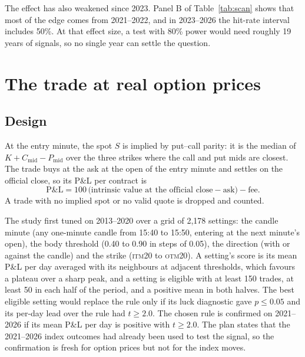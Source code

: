 \documentclass[12pt,letterpaper]{article}
\newcommand{\ITM}[1]{\textsc{itm}#1}
\newcommand{\OTM}[1]{\textsc{otm}#1}
\begin{document}
The effect has also weakened since 2023. Panel B of Table~\ref{tab:scan} shows
that most of the edge comes from 2021--2022, and in 2023--2026 the hit-rate
interval includes 50\%. At that effect size, a test with 80\% power would need
roughly 19 years of signals, so no single year can settle the question.

\section{The trade at real option prices}
\label{sec:realprice}



\subsection{Design}

At the entry minute, the spot $S$ is implied by put--call parity: it is the
median of $K + C_{\text{mid}} - P_{\text{mid}}$ over the three strikes where the
call and put mids are closest. The trade buys at the ask at the open of the entry
minute and settles on the official close, so its P\&L per contract is
\begin{equation}
\text{P\&L} = 100\,\bigl(\text{intrinsic value at the official close} - \text{ask}\bigr) - \text{fee}.
\end{equation}
A trade with no implied spot or no valid quote is dropped and counted.

The study first tuned on 2013--2020 over a grid of 2{,}178 settings: the candle
minute (any one-minute candle from 15:40 to 15:50, entering at the next minute's
open), the body threshold (0.40 to 0.90 in steps of 0.05), the direction (with or
against the candle) and the strike (\ITM{20} to \OTM{20}). A setting's score is
its mean P\&L per day averaged with its neighbours at adjacent thresholds, which
favours a plateau over a sharp peak, and a setting is eligible with at least 150
trades, at least 50 in each half of the period, and a positive mean in both
halves. The best eligible setting would replace the rule only if its luck
diagnostic gave $p \le 0.05$ and its per-day lead over the rule had $t \ge 2.0$.
The chosen rule is confirmed on 2021--2026 if its mean P\&L per day is positive
with $t \ge 2.0$. The plan states that the 2021--2026 index outcomes had already
been used to test the signal, so the confirmation is fresh for option prices but
not for the index moves.
\end{document}
